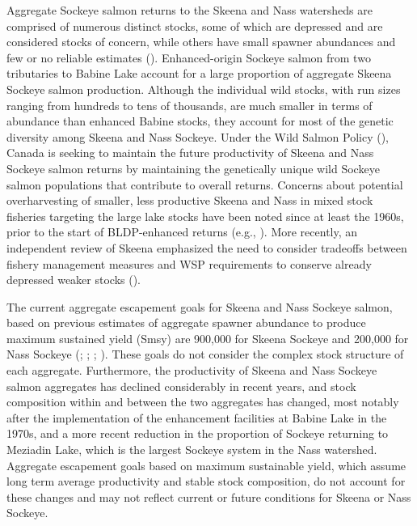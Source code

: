 \documentclass[french,11pt]{book}
\begin{document}
Aggregate Sockeye salmon returns to the Skeena and Nass watersheds are comprised of numerous distinct stocks, some of which are depressed and are considered stocks of concern, while others have small spawner abundances and few or no reliable estimates (). Enhanced-origin Sockeye salmon from two tributaries to Babine Lake account for a large proportion of aggregate Skeena Sockeye salmon production. Although the individual wild stocks, with run sizes ranging from hundreds to tens of thousands, are much smaller in terms of abundance than enhanced Babine stocks, they account for most of the genetic diversity among Skeena and Nass Sockeye. Under the Wild Salmon Policy (), Canada is seeking to maintain the future productivity of Skeena and Nass Sockeye salmon returns by maintaining the genetically unique wild Sockeye salmon populations that contribute to overall returns. Concerns about potential overharvesting of smaller, less productive Skeena and Nass in mixed stock fisheries targeting the large lake stocks have been noted since at least the 1960s, prior to the start of BLDP-enhanced returns (e.g., ). More recently, an independent review of Skeena emphasized the need to consider tradeoffs between fishery management measures and WSP requirements to conserve already depressed weaker stocks ().

The current aggregate escapement goals for Skeena and Nass Sockeye salmon, based on previous estimates of aggregate spawner abundance to produce maximum sustained yield (Smsy) are 900,000 for Skeena Sockeye and 200,000 for Nass Sockeye (; ; ; ). These goals do not consider the complex stock structure of each aggregate. Furthermore, the productivity of Skeena and Nass Sockeye salmon aggregates has declined considerably in recent years, and stock composition within and between the two aggregates has changed, most notably after the implementation of the enhancement facilities at Babine Lake in the 1970s, and a more recent reduction in the proportion of Sockeye returning to Meziadin Lake, which is the largest Sockeye system in the Nass watershed. Aggregate escapement goals based on maximum sustainable yield, which assume long term average productivity and stable stock composition, do not account for these changes and may not reflect current or future conditions for Skeena or Nass Sockeye.
\end{document}
